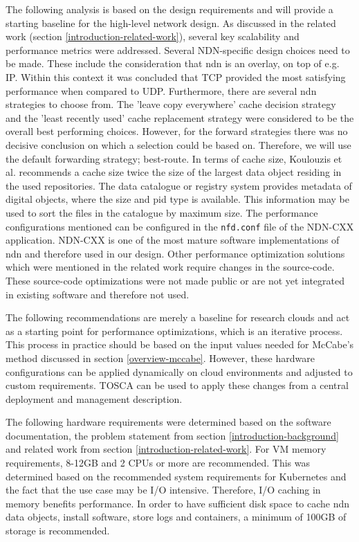 The following analysis is based on the design requirements and will provide a starting baseline for the high-level network design. As discussed in the related work (section \ref{introduction-related-work}), several key scalability and performance metrics were addressed. Several NDN-specific design choices need to be made. These include the consideration that \gls{ndn} is an overlay, on top of e.g. IP. Within this context it was concluded that TCP provided the most satisfying performance when compared to UDP. Furthermore, there are several \gls{ndn} strategies to choose from. The 'leave copy everywhere' cache decision strategy and the 'least recently used' cache replacement strategy were considered to be the overall best performing choices. However, for the forward strategies there was no decisive conclusion on which a selection could be based on. Therefore, we will use the default forwarding strategy; best-route. In terms of cache size, Koulouzis et al. recommends a cache size twice the size of the largest data object residing in the used repositories. The data catalogue or registry system provides metadata of digital objects, where the size and \gls{pid} type is available. This information may be used to sort the files in the catalogue by maximum size. The performance configurations mentioned can be configured in the \texttt{nfd.conf} file of the NDN-CXX application. NDN-CXX is one of the most mature software implementations of \gls{ndn} and therefore used in our design. Other performance optimization solutions which were mentioned in the related work require changes in the source-code. These source-code optimizations were not made public or are not yet integrated in existing software and therefore not used.

The following recommendations are merely a baseline for research clouds and act as a starting point for performance optimizations, which is an iterative process. This process in practice should be based on the input values needed for McCabe's method discussed in section \ref{overview-mccabe}. However, these hardware configurations can be applied dynamically on cloud environments and adjusted to custom requirements. TOSCA can be used to apply these changes from a central deployment and management description.

The following hardware requirements were determined based on the software documentation, the problem statement from section \ref{introduction-background} and related work from section \ref{introduction-related-work}. For VM memory requirements, 8-12GB and 2 CPUs or more are recommended. This was determined based on the recommended system requirements for Kubernetes \cite{kubernetes-system-requirements} and the fact that the use case may be I/O intensive. Therefore, I/O caching in memory benefits performance. In order to have sufficient disk space to cache \gls{ndn} data objects, install software, store logs and containers, a minimum of 100GB of storage is recommended.

